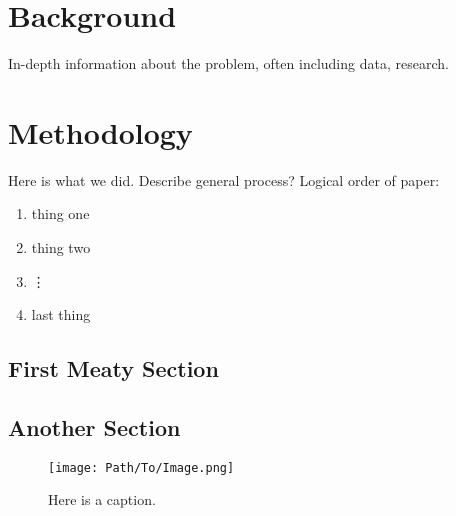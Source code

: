 \documentclass[twocolumn]{article}
\begin{document}
\section{Background}

In-depth information about the problem, often including data, research.

\lipsum[1-2]

\section{Methodology}

Here is what we did. Describe general process?
Logical order of paper:
\begin{enumerate}
    \item thing one
    \item thing two
    \item \vdots
    \item last thing
\end{enumerate}

\lipsum[1]

\subsection{First Meaty Section}
\label{sec:OpeningSection}

\limsup[1-2]

\subsection{Another Section}
\label{sec:AnotherSection}

\limsup[1-2]

\begin{figure}[h]
    \centering
    \texttt{[image: Path/To/Image.png]}
    \caption{Here is a caption.}
    \label{fig:SampleFigure}
\end{figure}
\end{document}
